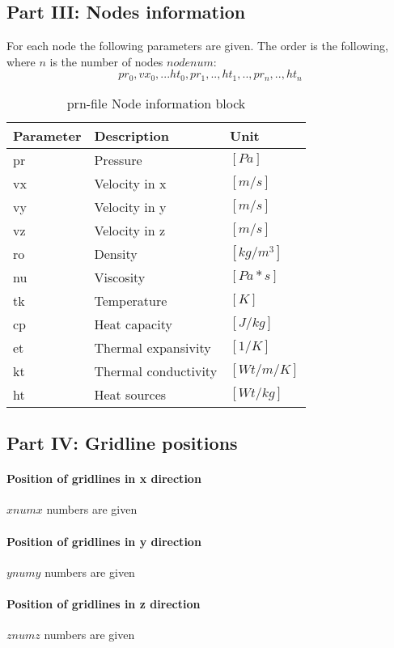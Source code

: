 \subsection{Part III: Nodes information}

For each node the following parameters are given. The order is the following, where $n$ is the number of nodes $nodenum$: $${pr_0,vx_0,...ht_0,pr_1,..,ht_1,..,pr_n,..,ht_n}$$

\begin{table}[H]
\small
\centering
\begin{tabular}{l l p{2cm}}
\toprule
Parameter & Description & Unit\\
\midrule
pr & Pressure & $[Pa]$ \\ 
vx & Velocity in x & $[m/s]$ \\ 
vy & Velocity in y & $[m/s]$ \\ 
vz & Velocity in z & $[m/s]$ \\ 
ro & Density & $[kg/m^3]$ \\ 
nu & Viscosity & $[Pa*s]$ \\ 
tk & Temperature & $[K]$ \\ 
cp & Heat capacity & $[J/kg]$ \\ 
et & Thermal expansivity & $[1/K]$ \\ 
kt & Thermal conductivity & $[Wt/m/K]$ \\
ht  & Heat sources & $[Wt/kg]$ \\
\bottomrule
\end{tabular}
\caption{prn-file Node information block}
\label{tbl:prn_node_info}
\end{table}

\subsection{Part IV: Gridline positions}

\paragraph{Position of gridlines in x direction} $xnumx$ numbers are given
\paragraph{Position of gridlines in y direction }$ynumy$ numbers are given
\paragraph{Position of gridlines in z direction} $znumz$ numbers are given

